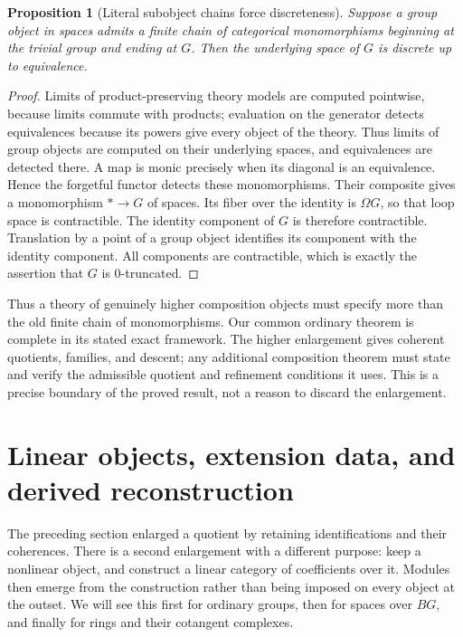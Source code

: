 \documentclass[11pt]{article}
\newtheorem{proposition}[theorem]{Proposition}
\theoremstyle{definition}
\theoremstyle{remark}\newtheorem{remark}[theorem]{Remark}
\begin{document}
\begin{proposition}[Literal subobject chains force discreteness]
\label{h:monos-discrete}
Suppose a group object in spaces admits a finite chain of categorical
monomorphisms beginning at the trivial group and ending at $G$.  Then
the underlying space of $G$ is discrete up to equivalence.
\end{proposition}
\begin{proof}
Limits of product-preserving theory models are computed pointwise,
because limits commute with products; evaluation on the generator
detects equivalences because its powers give every object of the theory.
Thus limits of group objects are computed on their underlying spaces,
and equivalences are detected there.  A map is monic precisely when its
diagonal is an equivalence.  Hence the forgetful functor detects these
monomorphisms.  Their composite gives a monomorphism $*\to G$ of spaces.
Its fiber over the identity is $\Omega G$, so that loop space is
contractible.  The identity component of $G$ is therefore contractible.
Translation by a point of a group object identifies its component with
the identity component.  All components are contractible, which is
exactly the assertion that $G$ is $0$-truncated.
\end{proof}

Thus a theory of genuinely higher composition objects must specify more
than the old finite chain of monomorphisms.  Our common ordinary theorem
is complete in its stated exact framework.  The higher enlargement gives
coherent quotients, families, and descent; any additional composition
theorem must state and verify the admissible quotient and refinement
conditions it uses.  This is a precise boundary of the proved result,
not a reason to discard the enlargement.



\section{Linear objects, extension data, and derived reconstruction}
\label{t:chapter}

The preceding section enlarged a quotient by retaining identifications and
their coherences.  There is a second enlargement with a different purpose:
keep a nonlinear object, and construct a linear category of coefficients
over it.  Modules then emerge from the construction rather than being
imposed on every object at the outset.  We will see this first for ordinary
groups, then for spaces over $BG$, and finally for rings and their
cotangent complexes.
\end{document}
